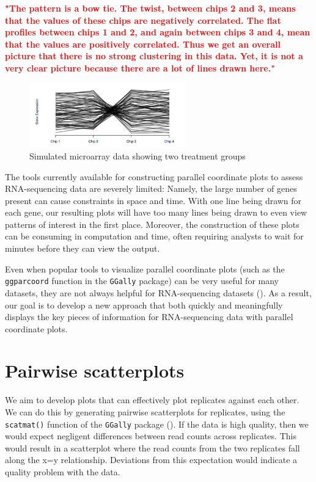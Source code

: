 \documentclass[11pt,a4paper,oldfontcommands,openany]{memoir}
\numberwithin{equation}{section} %
\newcommand{\code}[1]{{\texttt{#1}}}
\begin{document}
\textbf{\textcolor{Red}{"The pattern is a bow tie. The twist, between chips 2 and 3, means that the values of these chips are negatively correlated. The flat profiles between chips 1 and 2, and again between chips 3 and 4, mean that the values are positively correlated. Thus we get an overall picture that there is no strong clustering in this data. Yet, it is not a very clear picture because there are a lot of lines drawn here."}}

\begin{figure}[H]
    \begin{framed}
    \centering
    \includegraphics[width=0.6\textwidth]{pcp}
    \end{framed}
    \caption{Simulated microarray data showing two treatment groups}
    \label{fig:pcp}
\end{figure}

The tools currently available for constructing parallel coordinate plots to assess RNA-sequencing data are severely limited: Namely, the large number of genes present can cause constraints in space and time. With one line being drawn for each gene, our resulting plots will have too many lines being drawn to even view patterns of interest in the first place. Moreover, the construction of these plots can be consuming in computation and time, often requiring analysts to wait for minutes before they can view the output.

Even when popular tools to visualize parallel coordinate plots (such as the \code{ggparcoord} function in the \code{GGally} package) can be very useful for many datasets, they are not always helpful for RNA-sequencing datasets (\citealt{ggally}). As a result, our goal is to develop a new approach that both quickly and meaningfully displays the key pieces of information for RNA-sequencing data with parallel coordinate plots. 

\section{Pairwise scatterplots}

We aim to develop plots that can effectively plot replicates against each other. We can do this by generating pairwise scatterplots for replicates, using the \code{scatmat()} function of the \code{GGally} package (\citealt{ggally}). If the data is high quality, then we would expect negligent differences between read counts across replicates. This would result in a scatterplot where the read counts from the two replicates fall along the x=y relationship. Deviations from this expectation would indicate a quality problem with the data.
\end{document}
